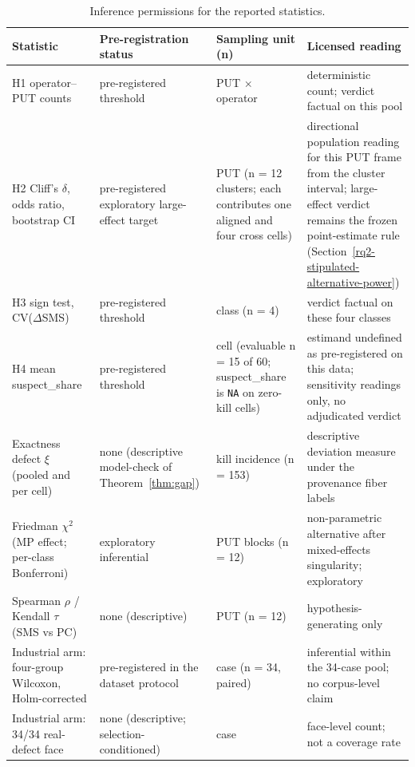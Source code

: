 \documentclass[manuscript,screen,review]{acmart}
\begin{document}
{%
\begin{longtable}[]{@{}
  >{\raggedright\arraybackslash}p{}
  >{\raggedright\arraybackslash}p{}
  >{\raggedright\arraybackslash}p{}
  >{\raggedright\arraybackslash}p{}@{}}
\caption{Inference permissions for the reported statistics.}\label{tab:inference-permissions}\\
\toprule\noalign{}
Statistic & Pre-registration status & Sampling unit (n) & Licensed reading \\
\midrule\noalign{}
\endfirsthead
\endhead
\bottomrule\noalign{}
\endlastfoot
H1 operator--PUT counts & pre-registered threshold & PUT $\times$
operator & deterministic count; verdict factual on this pool \\
H2 Cliff's $\delta$, odds ratio, bootstrap CI & pre-registered
exploratory large-effect target & PUT (n = 12 clusters; each contributes
one aligned and four cross cells) & directional population reading for
this PUT frame from the cluster interval; large-effect verdict remains
the frozen point-estimate rule
(Section~\ref{rq2-stipulated-alternative-power}) \\
H3 sign test, CV($\Delta$SMS) & pre-registered threshold & class (n = 4)
& verdict factual on these four classes \\
H4 mean suspect\_share & pre-registered threshold & cell (evaluable
n = 15 of 60; suspect\_share is \texttt{NA} on zero-kill cells) &
estimand undefined as pre-registered on this data; sensitivity readings
only, no adjudicated verdict \\
Exactness defect $\xi$ (pooled and per cell) & none (descriptive
model-check of Theorem~\ref{thm:gap}) & kill incidence (n = 153) &
descriptive deviation measure under the provenance fiber labels \\
Friedman $\chi^2$ (MP effect; per-class Bonferroni) & exploratory
inferential & PUT blocks (n = 12) & non-parametric alternative after
mixed-effects singularity; exploratory \\
Spearman $\rho$ / Kendall $\tau$ (SMS vs PC) & none (descriptive) & PUT
(n = 12) & hypothesis-generating only \\
Industrial arm: four-group Wilcoxon, Holm-corrected & pre-registered in
the dataset protocol & case (n = 34, paired) & inferential within the
34-case pool; no corpus-level claim \\
Industrial arm: 34/34 real-defect face & none (descriptive; selection-conditioned) & case &
face-level count; not a coverage rate \\
\end{longtable}
}
\end{document}
